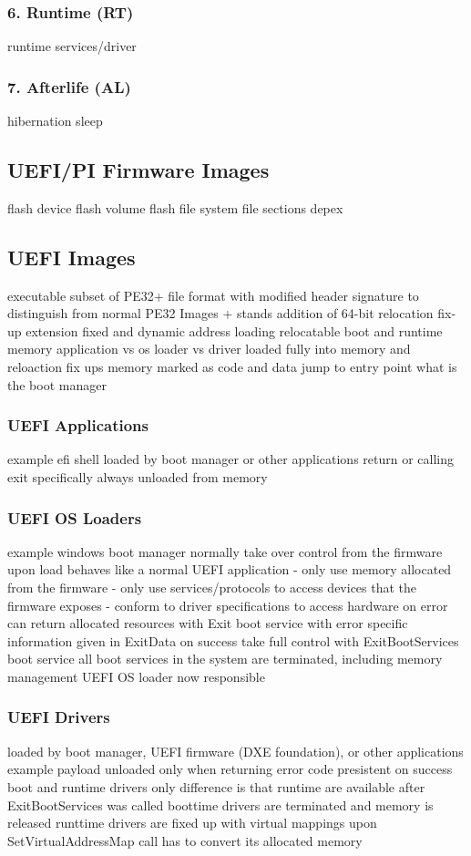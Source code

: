 \subsubsection{6. Runtime (RT)}
runtime services/driver
\subsubsection{7. Afterlife (AL)}
hibernation
sleep


\subsection{UEFI/PI Firmware Images}
flash device
flash volume
flash file system
file sections
depex

\subsection{UEFI Images}
executable
subset of PE32+ file format with modified header signature to distinguish from normal PE32 Images
+ stands addition of 64-bit relocation fix-up extension
fixed and dynamic address loading
relocatable
boot and runtime memory
application vs os loader vs driver
loaded fully into memory and reloaction fix ups
memory marked as code and data
jump to entry point
what is the boot manager

\subsubsection{UEFI Applications}
example efi shell
loaded by boot manager or other applications
return or calling exit specifically
always unloaded from memory

\subsubsection{UEFI OS Loaders}
example windows boot manager
normally take over control from the firmware
upon load behaves like a normal UEFI application
- only use memory allocated from the firmware
- only use services/protocols to access devices that the firmware exposes
- conform to driver specifications to access hardware
on error can return allocated resources with Exit boot service with error specific information given in ExitData
on success take full control with ExitBootServices boot service
all boot services in the system are terminated, including memory management
UEFI OS loader now responsible

\subsubsection{UEFI Drivers}
loaded by boot manager, UEFI firmware (DXE foundation), or other applications
example payload
unloaded only when returning error code
presistent on success
boot and runtime drivers
only difference is that runtime are available after ExitBootServices was called
boottime drivers are terminated and memory is released
runttime drivers are fixed up with virtual mappings upon SetVirtualAddressMap call
has to convert its allocated memory


